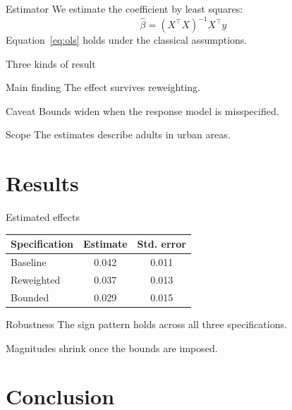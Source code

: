 \documentclass[aspectratio=169]{beamer}
\begin{document}
\begin{frame}{Estimator}
  We estimate the coefficient by least squares:
  \begin{equation}\label{eq:ols}
    \hat{\beta} = (X^\top X)^{-1} X^\top y
  \end{equation}
  Equation~\eqref{eq:ols} holds under the classical assumptions.
\end{frame}

\begin{frame}{Three kinds of result}
  \begin{exampleblock}{Main finding}
    The effect survives reweighting.
  \end{exampleblock}

  \begin{alertblock}{Caveat}
    Bounds widen when the response model is misspecified.
  \end{alertblock}

  \begin{block}{Scope}
    The estimates describe adults in urban areas.
  \end{block}
\end{frame}

\section{Results}

\begin{frame}{Estimated effects}
  \centering
  \begin{tabular}{lcc}
    \toprule
    Specification & Estimate & Std. error \\
    \midrule
    Baseline     & 0.042 & 0.011 \\
    Reweighted   & 0.037 & 0.013 \\
    Bounded      & 0.029 & 0.015 \\
    \bottomrule
  \end{tabular}
\end{frame}

\begin{frame}{Robustness}
  The sign pattern holds across all three specifications.

  \pause

  Magnitudes shrink once the bounds are imposed.
\end{frame}

\section{Conclusion}
\end{document}
